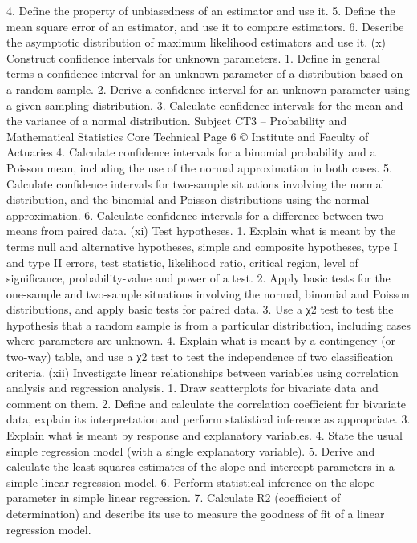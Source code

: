  4. Define the property of unbiasedness of an estimator and use it.  5. Define the mean square error of an estimator, and use it to compare estimators.  
 6. Describe the asymptotic distribution of maximum likelihood estimators and use it.  
(x) Construct confidence intervals for unknown parameters.  
 1. Define in general terms a confidence interval for an unknown parameter of a distribution based on a random sample.  
 2. Derive a confidence interval for an unknown parameter using a given sampling distribution.  
 3. Calculate confidence intervals for the mean and the variance of a normal distribution.  
Subject CT3 – Probability and Mathematical Statistics Core Technical   
Page 6 © Institute and Faculty of Actuaries 
 4. Calculate confidence intervals for a binomial probability and a Poisson mean, including the use of the normal approximation in both cases.  
 5. Calculate confidence intervals for two-sample situations involving the normal distribution, and the binomial and Poisson distributions using the normal approximation.  
 6. Calculate confidence intervals for a difference between two means from paired data.  
(xi) Test hypotheses.  
 1. Explain what is meant by the terms null and alternative hypotheses, simple and composite hypotheses, type I and type II errors, test statistic, likelihood ratio, critical region, level of significance, probability-value and power of a test.  
 2. Apply basic tests for the one-sample and two-sample situations involving the normal, binomial and Poisson distributions, and apply basic tests for paired data.  
 3. Use a χ2 test to test the hypothesis that a random sample is from a particular distribution, including cases where parameters are unknown.  
 4. Explain what is meant by a contingency (or two-way) table, and use a χ2 test to test the independence of two classification criteria.  
(xii) Investigate linear relationships between variables using correlation analysis and regression analysis.  
 1. Draw scatterplots for bivariate data and comment on them.  
 2. Define and calculate the correlation coefficient for bivariate data, explain its interpretation and perform statistical inference as appropriate.  
 3. Explain what is meant by response and explanatory variables.  
 4. State the usual simple regression model (with a single explanatory variable).  
 5. Derive and calculate the least squares estimates of the slope and intercept parameters in a simple linear regression model.   
 6. Perform statistical inference on the slope parameter in simple linear regression.  
 7. Calculate R2 (coefficient of determination) and describe its use to measure the goodness of fit of a linear regression model.  
